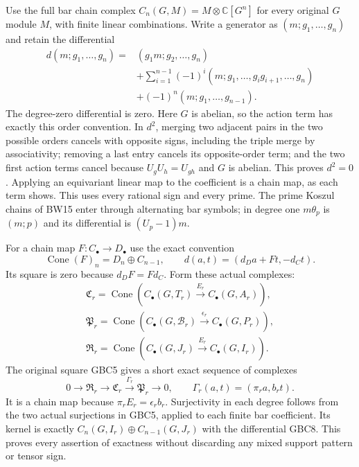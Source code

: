 Use the full bar chain complex $C_n(G,M)=M\otimes\mathbb C[G^n]$
for every original $G$ module $M$, with finite linear combinations.
Write a generator as $(m;g_1,\ldots,g_n)$ and retain the differential
\begin{equation}\tag{GBC7}
 \begin{split}
 d(m;g_1,\ldots,g_n)={}&(g_1m;g_2,\ldots,g_n)\\
 &+\sum_{i=1}^{n-1}(-1)^i
       (m;g_1,\ldots,g_ig_{i+1},\ldots,g_n)\\
 &+(-1)^n(m;g_1,\ldots,g_{n-1}).
 \end{split}
\end{equation}
The degree-zero differential is zero. Here $G$ is abelian, so
the action term has exactly this order convention. In $d^2$,
merging two adjacent pairs in the two possible orders cancels
with opposite signs, including the triple merge by associativity;
removing a last entry cancels its opposite-order term; and the
two first action terms cancel because $U_gU_h=U_{gh}$ and
$G$ is abelian. This proves $d^2=0$. Applying an equivariant
linear map to the coefficient is a chain map, as each term shows.
This uses every rational sign and every prime. The prime Koszul
chains of BW15 enter through alternating bar symbols; in degree
one $m\theta_p$ is $(m;p)$ and its differential is $(U_p-1)m$.

For a chain map $F:C_\bullet\to D_\bullet$ use the exact convention
\begin{equation}\tag{GBC8}
 \operatorname{Cone}(F)_n=D_n\oplus C_{n-1},\qquad
 d(a,t)=(d_Da+Ft,-d_Ct).
\end{equation}
Its square is zero because $d_DF=Fd_C$. Form these actual complexes:
\begin{equation}\tag{GBC9}
 \begin{gathered}
 \mathfrak C_r=\operatorname{Cone}(C_\bullet(G,T_r)
                         \xrightarrow{E_r}C_\bullet(G,A_r)),\\
 \mathfrak P_r=\operatorname{Cone}(C_\bullet(G,\mathcal B_r)
                         \xrightarrow{\epsilon_r}C_\bullet(G,P_r)),\\
 \mathfrak R_r=\operatorname{Cone}(C_\bullet(G,J_r)
                         \xrightarrow{E_r}C_\bullet(G,I_r)).
 \end{gathered}
\end{equation}
The original square GBC5 gives a short exact sequence of complexes
\begin{equation}\tag{GBC10}
 0\longrightarrow\mathfrak R_r\longrightarrow\mathfrak C_r
      \xrightarrow{\Gamma_r}\mathfrak P_r\longrightarrow0,
 \qquad \Gamma_r(a,t)=(\pi_ra,b_rt).
\end{equation}
It is a chain map because $\pi_rE_r=\epsilon_rb_r$.
Surjectivity in each degree follows from the two actual surjections
in GBC5, applied to each finite bar coefficient. Its kernel is
exactly $C_n(G,I_r)\oplus C_{n-1}(G,J_r)$ with the differential
GBC8. This proves every assertion of exactness without discarding
any mixed support pattern or tensor sign.

